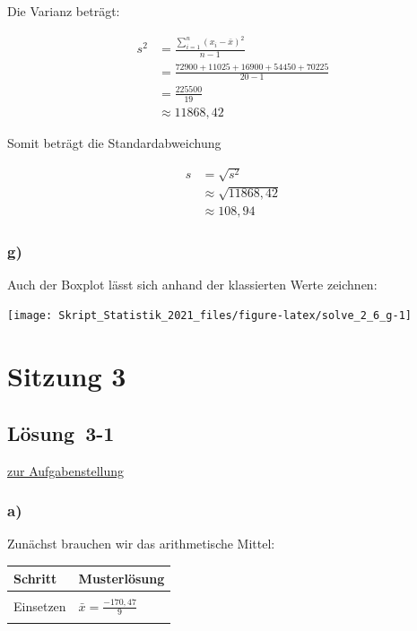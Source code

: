 \documentclass[
  11pt,
  ngerman,
  a4paper,
]{report}
\begin{document}
Die Varianz beträgt:

\[\begin{aligned}
  s^2&=\frac{\sum\limits_{i=1}^{n}(x_{i}-\bar{x})^2}{n-1} \\
     &=\frac{72900+11025+16900+54450+70225}{20-1}\\
     &=\frac{225500}{19}\\
     &\approx{11868{,}42}
\end{aligned}\]

Somit beträgt die Standardabweichung

\[\begin{aligned}
  s&=\sqrt{s^2}\\
   &\approx\sqrt{11868{,}42}\\
   &\approx108{,}94
\end{aligned}\]

\hypertarget{g}{%
\subsubsection{g)}\label{g}}

Auch der Boxplot lässt sich anhand der klassierten Werte zeichnen:

\begin{center}\texttt{[image: Skript\_Statistik\_2021\_files/figure-latex/solve\_2\_6\_g-1]} \end{center}

\hypertarget{sitzung-3}{%
\section*{Sitzung 3}\label{sitzung-3}}

\hypertarget{loesung-3-1}{%
\subsection{Lösung~3-1}\label{loesung-3-1}}

\protect\hyperlink{aufgabe-3-1}{zur Aufgabenstellung}

\hypertarget{a-8}{%
\subsubsection{a)}\label{a-8}}

Zunächst brauchen wir das arithmetische Mittel:

\begin{table}[H]
\centering
\begin{tabular}{l>{\raggedright\arraybackslash}p{8cm}}
\toprule
\textbf{Schritt} & \textbf{Musterlösung}\\
\midrule
\cellcolor{gray!6}{Formel} & \cellcolor{gray!6}{$\bar{x}=\frac{\sum\limits_{i=1}^{n}x_{i}}{n}$}\\
Einsetzen & $\bar{x}=\frac{-170{,}47}{9}$\\
\cellcolor{gray!6}{Ergebnis} & \cellcolor{gray!6}{$\bar{x}=-18{,}94$}\\
\bottomrule
\end{tabular}
\end{table}
\end{document}
